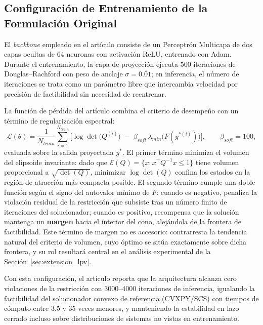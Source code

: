 \subsection{Configuración de Entrenamiento de la Formulación Original}
\label{subsec:receta_paper}

El \textit{backbone} empleado en el artículo consiste de un Perceptrón 
Multicapa de dos capas ocultas de $64$ neuronas con activación ReLU, entrenado con 
Adam. Durante el entrenamiento, la capa de proyección ejecuta $500$ iteraciones de 
Douglas--Rachford con peso de anclaje $\sigma = 0.01$; en inferencia, el número de 
iteraciones se trata como un parámetro libre que intercambia velocidad por precisión 
de factibilidad sin necesidad de reentrenar.



La función de pérdida del artículo combina el criterio de desempeño con un término de 
regularización espectral:
\begin{equation}
    \mathcal{L}(\theta) = \frac{1}{N_{train}} \sum_{i=1}^{N_{train}} \Big[ 
    \log\det\big(Q^{(i)}\big) 
    \;-\; \beta_{soft}\, \lambda_{min}\big(F(y^{*(i)})\big) \Big], 
    \qquad \beta_{soft} = 100,
    \label{eq:loss_aumentada}
\end{equation}
evaluada sobre la salida proyectada $y^{*}$. El primer término minimiza el volumen del 
elipsoide invariante: dado que $\mathcal{E}(Q) = \{x : x^\top Q^{-1} x \le 1\}$ tiene 
volumen proporcional a $\sqrt{\det(Q)}$, minimizar $\log\det(Q)$ confina los estados en la región de atracción más compacta posible.  El 
segundo término cumple una doble función según el signo del autovalor mínimo de $F$: 
cuando es negativo, penaliza la violación residual de la restricción que subsiste tras 
un número finito de iteraciones del solucionador; cuando es positivo, recompensa que 
la solución mantenga un \textbf{margen} hacia el interior del cono, alejándola de la 
frontera de factibilidad. Este término de margen no es accesorio: contrarresta la 
tendencia natural del criterio de volumen, cuyo óptimo se sitúa exactamente sobre 
dicha frontera, y su rol resultará central en el análisis experimental de la 
Sección~\ref{sec:extension_lpv}.

Con esta configuración, el artículo reporta que la arquitectura alcanza cero 
violaciones de la restricción con $3000$--$4000$ iteraciones de inferencia, igualando 
la factibilidad del solucionador convexo de referencia (CVXPY/SCS) con tiempos de 
cómputo entre $3.5$ y $35$ veces menores, y manteniendo la estabilidad en lazo cerrado 
incluso sobre distribuciones de sistemas no vistas en entrenamiento.








